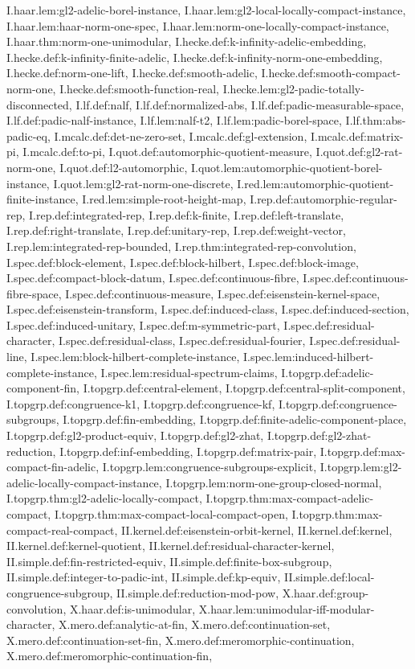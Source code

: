 \begin{theorem}
I.haar.lem:gl2-adelic-borel-instance, I.haar.lem:gl2-local-locally-compact-instance, I.haar.lem:haar-norm-one-spec, I.haar.lem:norm-one-locally-compact-instance, I.haar.thm:norm-one-unimodular, I.hecke.def:k-infinity-adelic-embedding, I.hecke.def:k-infinity-finite-adelic, I.hecke.def:k-infinity-norm-one-embedding, I.hecke.def:norm-one-lift, I.hecke.def:smooth-adelic, I.hecke.def:smooth-compact-norm-one, I.hecke.def:smooth-function-real, I.hecke.lem:gl2-padic-totally-disconnected, I.lf.def:nalf, I.lf.def:normalized-abs, I.lf.def:padic-measurable-space, I.lf.def:padic-nalf-instance, I.lf.lem:nalf-t2, I.lf.lem:padic-borel-space, I.lf.thm:abs-padic-eq, I.mcalc.def:det-ne-zero-set, I.mcalc.def:gl-extension, I.mcalc.def:matrix-pi, I.mcalc.def:to-pi, I.quot.def:automorphic-quotient-measure, I.quot.def:gl2-rat-norm-one, I.quot.def:l2-automorphic, I.quot.lem:automorphic-quotient-borel-instance, I.quot.lem:gl2-rat-norm-one-discrete, I.red.lem:automorphic-quotient-finite-instance, I.red.lem:simple-root-height-map, I.rep.def:automorphic-regular-rep, I.rep.def:integrated-rep, I.rep.def:k-finite, I.rep.def:left-translate, I.rep.def:right-translate, I.rep.def:unitary-rep, I.rep.def:weight-vector, I.rep.lem:integrated-rep-bounded, I.rep.thm:integrated-rep-convolution, I.spec.def:block-element, I.spec.def:block-hilbert, I.spec.def:block-image, I.spec.def:compact-block-datum, I.spec.def:continuous-fibre, I.spec.def:continuous-fibre-space, I.spec.def:continuous-measure, I.spec.def:eisenstein-kernel-space, I.spec.def:eisenstein-transform, I.spec.def:induced-class, I.spec.def:induced-section, I.spec.def:induced-unitary, I.spec.def:m-symmetric-part, I.spec.def:residual-character, I.spec.def:residual-class, I.spec.def:residual-fourier, I.spec.def:residual-line, I.spec.lem:block-hilbert-complete-instance, I.spec.lem:induced-hilbert-complete-instance, I.spec.lem:residual-spectrum-claims, I.topgrp.def:adelic-component-fin, I.topgrp.def:central-element, I.topgrp.def:central-split-component, I.topgrp.def:congruence-k1, I.topgrp.def:congruence-kf, I.topgrp.def:congruence-subgroups, I.topgrp.def:fin-embedding, I.topgrp.def:finite-adelic-component-place, I.topgrp.def:gl2-product-equiv, I.topgrp.def:gl2-zhat, I.topgrp.def:gl2-zhat-reduction, I.topgrp.def:inf-embedding, I.topgrp.def:matrix-pair, I.topgrp.def:max-compact-fin-adelic, I.topgrp.lem:congruence-subgroups-explicit, I.topgrp.lem:gl2-adelic-locally-compact-instance, I.topgrp.lem:norm-one-group-closed-normal, I.topgrp.thm:gl2-adelic-locally-compact, I.topgrp.thm:max-compact-adelic-compact, I.topgrp.thm:max-compact-local-compact-open, I.topgrp.thm:max-compact-real-compact, II.kernel.def:eisenstein-orbit-kernel, II.kernel.def:kernel, II.kernel.def:kernel-quotient, II.kernel.def:residual-character-kernel, II.simple.def:fin-restricted-equiv, II.simple.def:finite-box-subgroup, II.simple.def:integer-to-padic-int, II.simple.def:kp-equiv, II.simple.def:local-congruence-subgroup, II.simple.def:reduction-mod-pow, X.haar.def:group-convolution, X.haar.def:is-unimodular, X.haar.lem:unimodular-iff-modular-character, X.mero.def:analytic-at-fin, X.mero.def:continuation-set, X.mero.def:continuation-set-fin, X.mero.def:meromorphic-continuation, X.mero.def:meromorphic-continuation-fin, 
\end{theorem}
